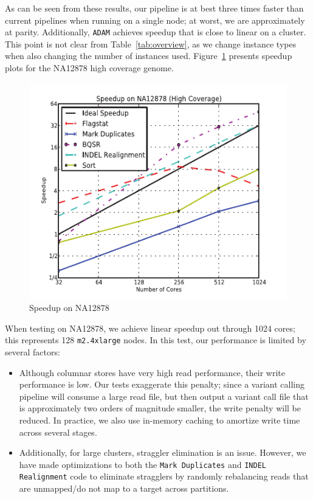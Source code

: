 \documentclass[masters]{ucbthesis}
\begin{document}
As can be seen from these results, our pipeline is at best three times faster than current pipelines when running
on a single node; at worst, we are approximately at parity. Additionally, \texttt{ADAM} achieves speedup that is
close to linear on a cluster. This point is not clear from Table~\ref{tab:overview}, as we change instance types when also
changing the number of instances used. Figure~\ref{fig:speedup} presents speedup plots for the NA12878 high
coverage genome.

\begin{figure}[h]
\begin{center}
\includegraphics[width=0.99\linewidth]{graphs/speedup_na12878.pdf}
\end{center}
\caption{Speedup on NA12878}
\label{fig:speedup}
\end{figure}

When testing on NA12878, we achieve linear speedup out through 1024 cores; this represents 128
\texttt{m2.4xlarge} nodes. In this test, our performance is limited by several factors:

\begin{itemize}
\item Although columnar stores have very high read performance, their write performance is low. Our
tests exaggerate this penalty; since a variant calling pipeline will consume a large read file, but then output a
variant call file that is approximately two orders of magnitude smaller, the write penalty will be reduced. In
practice, we also use in-memory caching to amortize write time across several stages.
\item Additionally, for large clusters, straggler elimination is an issue. However, we have made optimizations to
both the \texttt{Mark Duplicates} and \texttt{INDEL Realignment} code to eliminate stragglers by randomly
rebalancing reads that are unmapped/do not map to a target across partitions.
\end{itemize}
\end{document}
